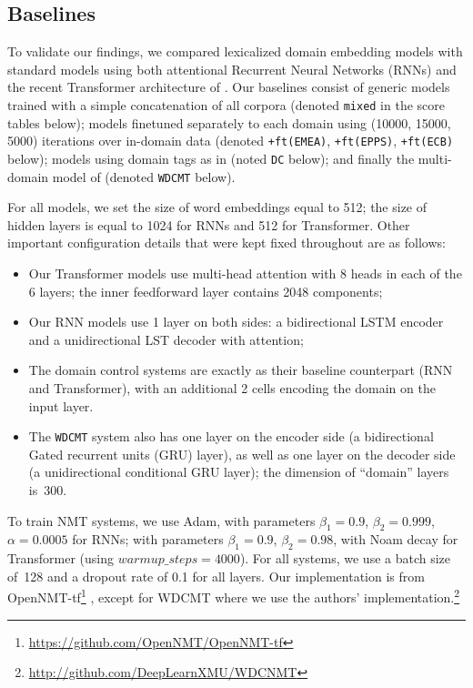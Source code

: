 \documentclass[11pt,a4paper]{article}
\newcommand{\fyTodo}[1]{\Todo[FY:]{\textcolor{orange}{#1}}}
\newcommand{\fyDone}[1]{\done[FY]\Todo[FY:]{\textcolor{orange}{#1}}}
\begin{document}
\subsection{Baselines \label{ssec:baselines}}
To validate our findings, we compared lexicalized domain embedding models with standard models using both attentional Recurrent Neural Networks (RNNs) \cite{Bahdanau15learning} and the recent Transformer architecture of \citet{Vaswani17attention}. Our baselines consist of generic models trained with a simple concatenation of all corpora (denoted \texttt{mixed} in the score tables below); models finetuned separately to each domain using (10000, 15000, 5000) iterations over in-domain data (denoted \texttt{+ft(EMEA)}, \texttt{+ft(EPPS)}, \texttt{+ft(ECB)} below); models using domain tags as in \cite{Kobus17domaincontrol} (noted \texttt{DC} below); and finally the multi-domain model of \citet{Zeng18multidomain} (denoted \texttt{WDCMT} below).\fyTodo{Change names in tables}

For all models, we set the size of word embeddings equal to 512; the size of hidden layers is equal to 1024 for RNNs and 512 for Transformer. Other important configuration details that were kept fixed throughout are as follows:
\fyDone{Improve this}
\begin{itemize}
\item Our Transformer models use multi-head attention with 8 heads in each of the 6 layers; the inner feedforward layer contains 2048 components; 
\item Our RNN models use 1 layer on both sides: a bidirectional LSTM encoder and a unidirectional LST decoder with attention;
\item The domain control systems are exactly as their baseline counterpart (RNN and Transformer), with an additional 2 cells encoding the domain on the input layer.\fyDone{Check This!}
\item The \texttt{WDCMT} system also has one layer on the encoder side (a bidirectional Gated recurrent units (GRU) layer), as well as one layer on the decoder side (a unidirectional conditional GRU layer); the dimension of ``domain'' layers is~300.
\end{itemize}
To train NMT systems, we use Adam, with parameters $\beta_1=0.9$, $\beta_2 = 0.999$, $\alpha=0.0005$ for RNNs; with parameters $\beta_1=0.9$, $\beta_2= 0.98$, with Noam decay \cite{Vaswani17attention} for Transformer (using $warmup\_steps=4000$). For all systems, we use a batch size of~128 and a dropout rate of 0.1 for all layers. Our implementation is from OpenNMT-tf\footnote{\url{https://github.com/OpenNMT/OpenNMT-tf}} \cite{Klein2017OpenNMT}, except for WDCMT where we use the authors' implementation.\footnote{\noindent\url{http://github.com/DeepLearnXMU/WDCNMT}}\fyDone{batch size}
\end{document}
